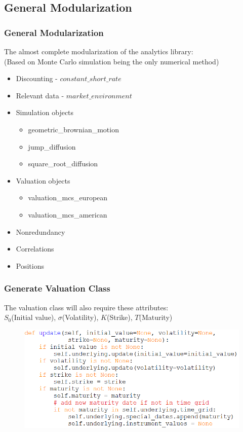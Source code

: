 \documentclass{beamer}
\begin{document}
\subsection{General Modularization}

\begin{frame}
\frametitle{General Modularization}
The almost complete modularization of the analytics library:\\
(Based on Monte Carlo simulation being the only numerical method)
\begin{itemize}
	\item Discounting - $constant\_short\_rate$
	\item Relevant data - $market\_environment$
	\item Simulation objects
	\begin{itemize}
		\item geometric\_brownian\_motion
		\item jump\_diffusion
		\item square\_root\_diffusion
	\end{itemize}
	\item Valuation objects
	\begin{itemize}
		\item valuation\_mcs\_european
		\item valuation\_mcs\_american
	\end{itemize}
	\item Nonredundancy
	\item Correlations
	\item Positions
\end{itemize}
\end{frame}

\begin{frame}
\frametitle{Generate Valuation Class}
The valuation class will also require these attributes:\\
$S_{0}$(Initial value), $\sigma$(Volatility), $K$(Strike), $T$(Maturity)
\begin{figure}[H]
	\includegraphics[scale=0.5]{update_valuation_class.png}
\end{figure}
\end{frame}
\end{document}
